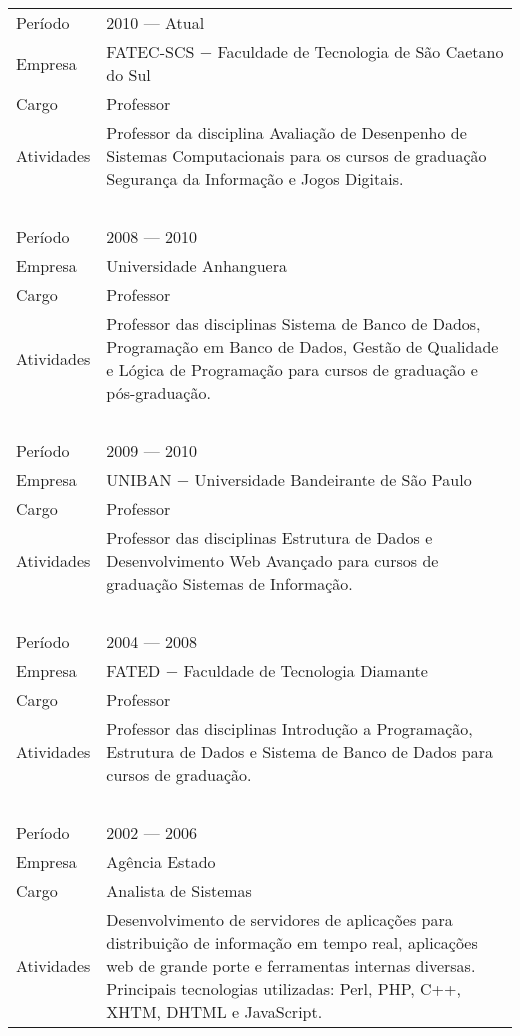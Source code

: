 \documentclass[a4paper, oneside, final]{scrartcl}
\begin{document}
\begin{center}
\begin{tabularx}{0.97\linewidth}{p{2cm}X}
Período     & 2010 --- Atual\\
Empresa     & FATEC-SCS $-$ Faculdade de Tecnologia de São Caetano do Sul\\
Cargo       & Professor\\
Atividades  & Professor da disciplina Avaliação de Desenpenho de Sistemas Computacionais para os cursos de graduação Segurança da Informação e Jogos Digitais.\\
            & \ \\

Período     & 2008 --- 2010\\
Empresa     & Universidade Anhanguera\\
Cargo       & Professor\\
Atividades  & Professor das disciplinas Sistema de Banco de Dados, Programação em Banco de Dados, Gestão de Qualidade e Lógica de Programação para cursos de graduação e pós-graduação.\\
            & \ \\

Período     & 2009 --- 2010\\
Empresa     & UNIBAN $-$ Universidade Bandeirante de São Paulo\\
Cargo       & Professor\\
Atividades  & Professor das disciplinas Estrutura de Dados e Desenvolvimento Web Avançado para cursos de graduação Sistemas de Informação.\\
            & \ \\

Período     & 2004 --- 2008\\
Empresa     & FATED $-$ Faculdade de Tecnologia Diamante\\
Cargo       & Professor\\
Atividades  & Professor das disciplinas Introdução a Programação, Estrutura de Dados e Sistema de Banco de Dados para cursos de graduação.\\
            & \ \\

Período     & 2002 --- 2006\\
Empresa     & Agência Estado\\
Cargo       & Analista de Sistemas\\
Atividades  & Desenvolvimento de servidores de aplicações para distribuição de informação em tempo real, aplicações web de grande porte e ferramentas internas diversas. Principais tecnologias utilizadas: Perl, PHP, C++, XHTM, DHTML e JavaScript.\\
\end{tabularx}


\end{center}
\end{document}

